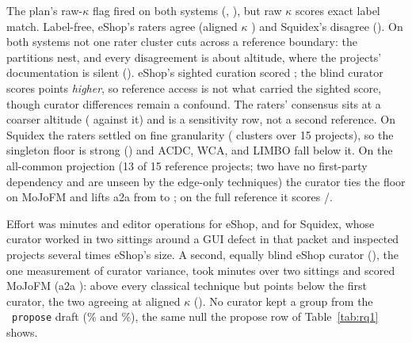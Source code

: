 The plan's raw-$\kappa$ flag fired on both systems (\rqNineEshopKappa{}, \rqNineSquidexKappa{}),
but raw $\kappa$ scores exact label match. Label-free, eShop's raters agree (aligned $\kappa$
\rqNineEshopKappaAligned{}) and Squidex's disagree (\rqNineSquidexKappaAligned{}). On both systems
not one rater cluster cuts across a reference boundary: the partitions nest, and every
disagreement is about altitude, where the projects' documentation is silent (\trCuration{}).
eShop's sighted curation scored \rqNineEshopNonBlindMoJo{}; the blind curator scores
\rqNineEshopLeakageDelta{} points \emph{higher}, so reference access is not what carried the
sighted score, though curator differences remain a confound. The raters' consensus sits at a
coarser altitude (\rqNineEshopCuratorVsConsensusMoJo{} against it) and is a sensitivity row, not
a second reference. On Squidex the raters settled on fine granularity
(\rqNineSquidexConsensusClusters{} clusters over 15 projects), so the singleton floor is strong
(\rqNineSquidexFloorMoJo{}) and ACDC, WCA, and LIMBO fall below it. On the all-common projection
(13 of 15 reference projects; two have no first-party dependency and are unseen by the edge-only
techniques) the curator ties the floor on MoJoFM and lifts a2a from \rqNineSquidexFloorAtoA{} to
\rqNineSquidexCuratorAtoA{}; on the full reference it scores
\rqNineSquidexCuratorFullRefMoJo{}/\rqNineSquidexCuratorFullRefAtoA{}.

Effort was \rqNineEshopMinutes{} minutes and \rqNineEshopOps{} editor operations for eShop,
\rqNineSquidexMinutes{} and \rqNineSquidexOps{} for Squidex, whose curator worked in two
sittings around a GUI defect in that packet and inspected projects several times eShop's
size. A second, equally blind eShop curator (\rqNineEshopSecondCuratorCode{}), the one
measurement of curator variance, took \rqNineEshopSecondCuratorMinutes{} minutes over two
sittings and scored \rqNineEshopSecondCuratorMoJo{} MoJoFM (a2a
\rqNineEshopSecondCuratorAtoA{}): above every classical technique but
\rqNineEshopCuratorMoJoSpread{} points below the first curator, the two agreeing at aligned
$\kappa$ \rqNineEshopCuratorPairKappaAligned{} (\trCuration{}). No curator kept a group from the
\cli~\texttt{propose} draft (\rqNineEshopProposeDerivedPct\% and
\rqNineSquidexProposeDerivedPct\%), the same null the propose row of Table~\ref{tab:rq1} shows.
